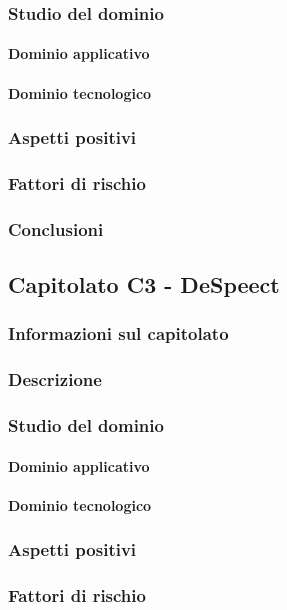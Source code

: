 		\subsubsection{Studio del dominio}
			\paragraph{Dominio applicativo}
			\paragraph{Dominio tecnologico}
		\subsubsection{Aspetti positivi}
		\subsubsection{Fattori di rischio}
		\subsubsection{Conclusioni}
	
	\subsection{Capitolato C3 - DeSpeect}
		\subsubsection{Informazioni sul capitolato}
		\subsubsection{Descrizione}
		\subsubsection{Studio del dominio}
			\paragraph{Dominio applicativo}
			\paragraph{Dominio tecnologico}
		\subsubsection{Aspetti positivi}
		\subsubsection{Fattori di rischio}
